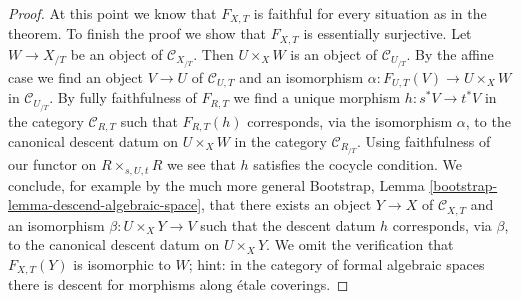 \begin{proof}
\medskip\noindent
At this point we know that $F_{X, T}$ is faithful for every situation
as in the theorem. To finish the proof we show that $F_{X, T}$ is
essentially surjective. Let $W \to X_{/T}$ be an object of
$\mathcal{C}_{X_{/T}}$. Then $U \times_X W$ is an object of
$\mathcal{C}_{U_{/T}}$. By the affine case we find an object
$V \to U$ of $\mathcal{C}_{U, T}$ and an isomorphism
$\alpha : F_{U, T}(V) \to U \times_X W$ in $\mathcal{C}_{U_{/T}}$.
By fully faithfulness of $F_{R, T}$ we find a unique morphism
$h : s^*V \to t^*V$ in the category $\mathcal{C}_{R, T}$ such that
$F_{R, T}(h)$ corresponds, via the isomorphism $\alpha$, to the
canonical descent datum on $U \times_X W$ in the category
$\mathcal{C}_{R_{/T}}$. Using faithfulness of our functor on
$R \times_{s, U, t} R$ we see that $h$ satisfies the cocycle
condition. We conclude, for example by the much more general
Bootstrap, Lemma \ref{bootstrap-lemma-descend-algebraic-space},
that there exists an object $Y \to X$ of $\mathcal{C}_{X, T}$
and an isomorphism $\beta : U \times_X Y \to V$ such that the
descent datum $h$ corresponds, via $\beta$, to the canonical descent
datum on $U \times_X Y$. We omit the verification that
$F_{X, T}(Y)$ is isomorphic to $W$; hint: in the category of formal
algebraic spaces there is descent for morphisms along \'etale coverings.
\end{proof}











